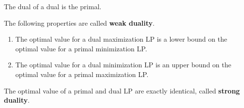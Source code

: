   \begin{theorem}
    The dual of a dual is the primal. 
  \end{theorem}

  \begin{theorem}
    The following properties are called \textbf{weak duality}. 
    \begin{enumerate}
      \item The optimal value for a dual maximization LP is a lower bound on the optimal value for a primal minimization LP. 
      \item The optimal value for a dual minimization LP is an upper bound on the optimal value for a primal maximization LP. 
    \end{enumerate}
  \end{theorem}

  \begin{theorem}
    The optimal value of a primal and dual LP are exactly identical, called \textbf{strong duality}. 
  \end{theorem}
